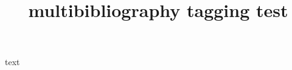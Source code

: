 \documentclass{article}
\title{multibibliography tagging test}
\begin{document}
text
\end{document}
